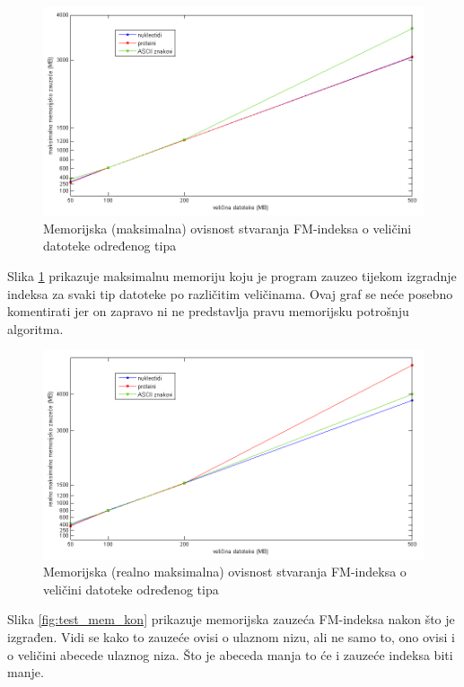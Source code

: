 \begin{figure}[H]
   \centering
       \includegraphics[width=\textwidth]{./pictures/test_mem_max.png}
 \caption{Memorijska (maksimalna) ovisnost stvaranja FM-indeksa o veličini datoteke određenog tipa}
 \label{fig:test_mem_max}
\end{figure}

Slika \ref{fig:test_mem_max} prikazuje maksimalnu memoriju koju je program zauzeo tijekom izgradnje indeksa za svaki tip datoteke po različitim veličinama. Ovaj graf se neće posebno komentirati jer on zapravo ni ne predstavlja pravu memorijsku potrošnju algoritma.


\begin{figure}[H]
   \centering
       \includegraphics[width=\textwidth]{./pictures/test_mem_realmax.png}
 \caption{Memorijska (realno maksimalna) ovisnost stvaranja FM-indeksa o veličini datoteke određenog tipa}
 \label{fig:test_mem_realmax}
\end{figure}

Slika \ref{fig:test_mem_kon} prikazuje memorijska zauzeća FM-indeksa nakon što je izgrađen. Vidi se kako to zauzeće ovisi o ulaznom nizu, ali ne samo to, ono ovisi i o veličini abecede ulaznog niza. Što je abeceda manja to će i zauzeće indeksa biti manje.

